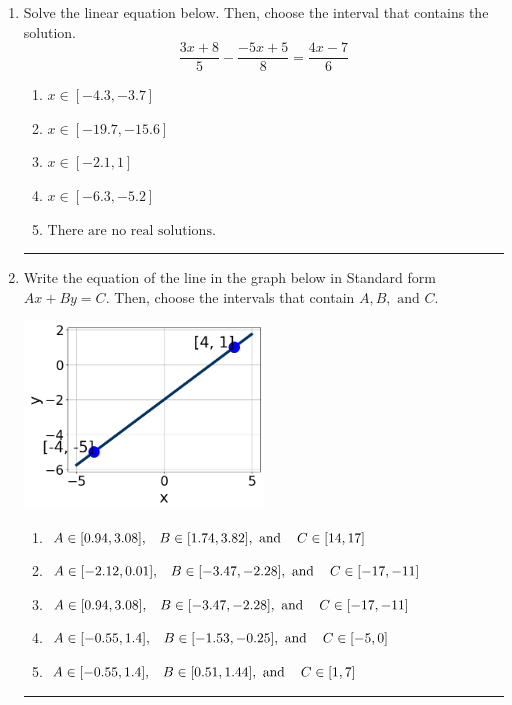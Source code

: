 \documentclass[14pt]{extbook}
\newcommand{\litem}[1]{\item#1\hspace*{-1cm}\rule{\textwidth}{0.4pt}}
\begin{document}
\begin{enumerate}
\litem{
Solve the linear equation below. Then, choose the interval that contains the solution.\[ \frac{3x + 8}{5} - \frac{-5x + 5}{8} = \frac{4x -7}{6} \]\begin{enumerate}[label=\Alph*.]
\item \( x \in [-4.3, -3.7] \)
\item \( x \in [-19.7, -15.6] \)
\item \( x \in [-2.1, 1] \)
\item \( x \in [-6.3, -5.2] \)
\item \( \text{There are no real solutions.} \)

\end{enumerate} }
\litem{
Write the equation of the line in the graph below in Standard form $Ax+By=C$. Then, choose the intervals that contain $A, B, \text{ and } C$.
\begin{center}
    \includegraphics[width=0.5\textwidth]{../Figures/linearGraphToStandardA.png}
\end{center}
\begin{enumerate}[label=\Alph*.]
\item \( A \in [0.94, 3.08], \hspace{3mm} B \in [1.74, 3.82], \text{ and } \hspace{3mm} C \in [14, 17] \)
\item \( A \in [-2.12, 0.01], \hspace{3mm} B \in [-3.47, -2.28], \text{ and } \hspace{3mm} C \in [-17, -11] \)
\item \( A \in [0.94, 3.08], \hspace{3mm} B \in [-3.47, -2.28], \text{ and } \hspace{3mm} C \in [-17, -11] \)
\item \( A \in [-0.55, 1.4], \hspace{3mm} B \in [-1.53, -0.25], \text{ and } \hspace{3mm} C \in [-5, 0] \)
\item \( A \in [-0.55, 1.4], \hspace{3mm} B \in [0.51, 1.44], \text{ and } \hspace{3mm} C \in [1, 7] \)


\end{enumerate}}
\end{enumerate}
\end{document}
